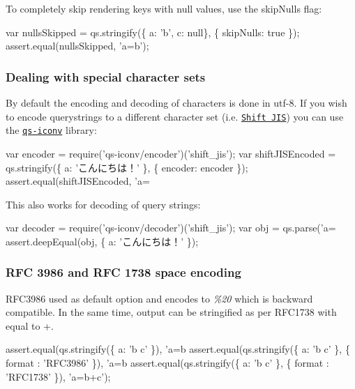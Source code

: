 To completely skip rendering keys with {\ttfamily null} values, use the {\ttfamily skip\+Nulls} flag\+:


\begin{DoxyCode}
var nullsSkipped = qs.stringify(\{ a: 'b', c: null\}, \{ skipNulls: true \});
assert.equal(nullsSkipped, 'a=b');
\end{DoxyCode}


\subsubsection*{Dealing with special character sets}

By default the encoding and decoding of characters is done in {\ttfamily utf-\/8}. If you wish to encode querystrings to a different character set (i.\+e. \href{https://en.wikipedia.org/wiki/Shift_JIS}{\tt Shift J\+IS}) you can use the \href{https://github.com/martinheidegger/qs-iconv}{\tt {\ttfamily qs-\/iconv}} library\+:


\begin{DoxyCode}
var encoder = require('qs-iconv/encoder')('shift\_jis');
var shiftJISEncoded = qs.stringify(\{ a: 'こんにちは！' \}, \{ encoder: encoder \});
assert.equal(shiftJISEncoded, 'a=%
\end{DoxyCode}


This also works for decoding of query strings\+:


\begin{DoxyCode}
var decoder = require('qs-iconv/decoder')('shift\_jis');
var obj = qs.parse('a=%
assert.deepEqual(obj, \{ a: 'こんにちは！' \});
\end{DoxyCode}


\subsubsection*{R\+FC 3986 and R\+FC 1738 space encoding}

R\+F\+C3986 used as default option and encodes \textquotesingle{} \textquotesingle{} to {\itshape \%20} which is backward compatible. In the same time, output can be stringified as per R\+F\+C1738 with \textquotesingle{} \textquotesingle{} equal to \textquotesingle{}+\textquotesingle{}.


\begin{DoxyCode}
assert.equal(qs.stringify(\{ a: 'b c' \}), 'a=b%
assert.equal(qs.stringify(\{ a: 'b c' \}, \{ format : 'RFC3986' \}), 'a=b%
assert.equal(qs.stringify(\{ a: 'b c' \}, \{ format : 'RFC1738' \}), 'a=b+c');
\end{DoxyCode}
 